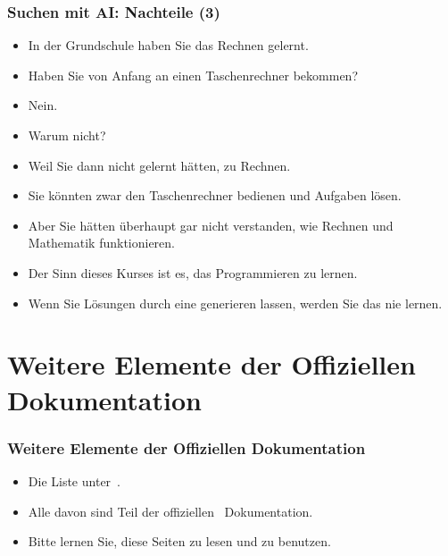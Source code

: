 \documentclass[aspectratio=169,mathserif,notheorems]{beamer}%
\begin{document}
%
\begin{frame}%
\frametitle{Suchen mit AI: Nachteile (3)}%
\begin{itemize}%
\item In der Grundschule haben Sie das Rechnen gelernt.%
\item<2-> Haben Sie von Anfang an einen Taschenrechner bekommen?%
\item<3-> Nein.%
\item<4-> Warum nicht?%
\item<5-> Weil Sie dann nicht gelernt hätten, zu Rechnen.%
\item<6-> Sie könnten zwar den Taschenrechner bedienen und Aufgaben lösen.%
\item<7-> Aber Sie hätten überhaupt gar nicht verstanden, wie Rechnen und Mathematik funktionieren.%
\item<8-> Der Sinn dieses Kurses ist es, das Programmieren zu lernen.%
\item<9-> Wenn Sie Lösungen durch eine  generieren lassen, werden Sie das nie lernen.%
\end{itemize}%
\end{frame}%
%
\section{Weitere Elemente der Offiziellen Dokumentation}%
%
\begin{frame}[t]%
\frametitle{Weitere Elemente der Offiziellen Dokumentation}%
\begin{itemize}%
%
%
%
%
\item<5-> Die  Liste\cite{PEP0} unter~.%
\item<6-> Alle davon sind Teil der offiziellen \python~Dokumentation.%
\item<7-> Bitte lernen Sie, diese Seiten zu lesen und zu benutzen.%
\end{itemize}%
%
%
%
%
%
\end{frame}%
%
\end{document}
